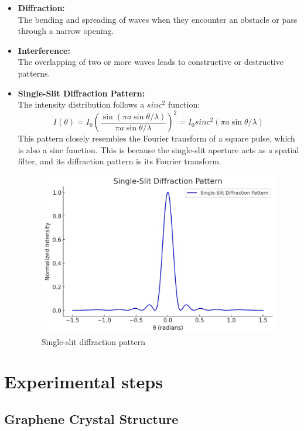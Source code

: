 \documentclass[12pt,a4paper]{article}
\begin{document}
\begin{CJK}{UTF8}{bkai}
\begin{itemize}
    \item \textbf{Diffraction:}\\
    The bending and spreading of waves when they encounter an obstacle or pass through a narrow opening.
    \item \textbf{Interference:}\\
    The overlapping of two or more waves leads to constructive or destructive patterns.
    \item \textbf{Single-Slit Diffraction Pattern:}\\
    The intensity distribution follows a $sinc^2$ function:
    \begin{equation}
    I(\theta) = I_0 \left( \frac{\sin \left( \pi a \sin \theta/\lambda \right)}{\pi a \sin \theta/\lambda} \right)^2 = I_0 sinc^2(\pi a \sin \theta/\lambda)
    \end{equation}
    This pattern closely resembles the Fourier transform of a square pulse, which is also a sinc function. This is because the single-slit aperture acts as a spatial filter, and its diffraction pattern is its Fourier transform.
    \begin{figure}[h]
        \centering
        \includegraphics[width=0.8\linewidth]{figures/Single-Slit_Diffraction_Pattern.jpg}
        \caption{Single-slit diffraction pattern}
        \label{fig:single-slit}
    \end{figure}
\end{itemize}


\clearpage
\section{Experimental steps}

\subsection{Graphene Crystal Structure}


\end{CJK}
\end{document}
